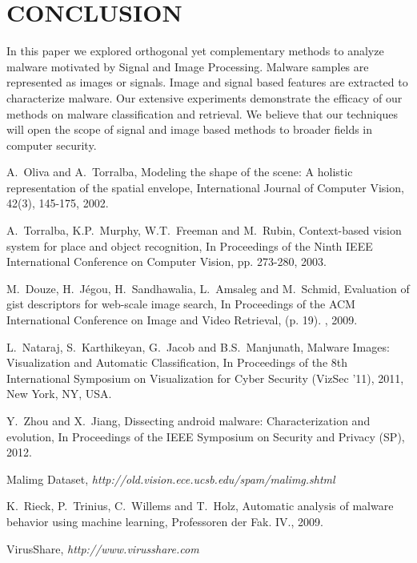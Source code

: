 \documentclass[journal]{IEEEtran}
\begin{document}
\section*{CONCLUSION}

In this paper we explored orthogonal yet complementary methods to analyze malware motivated by Signal and Image Processing.
Malware samples are represented as images or signals.
Image and signal based features are extracted to characterize malware.
Our extensive experiments demonstrate the efficacy of our methods on malware classification and retrieval.
We believe that our techniques will open the scope of signal and image based methods to broader fields in computer security.

\begin{thebibliography}{1}




A.~Oliva and A.~Torralba, Modeling the shape of the scene: A holistic representation of the spatial envelope, International Journal of Computer Vision, 42(3), 145-175, 2002.

A.~Torralba, K.P.~Murphy, W.T.~Freeman and M.~Rubin, Context-based vision system for place and object recognition, In Proceedings of the
Ninth IEEE International Conference on Computer Vision, pp. 273-280, 2003. 

M.~Douze, H.~Jégou, H.~Sandhawalia, L.~Amsaleg and M.~Schmid, Evaluation of gist descriptors for web-scale image search, In Proceedings of the ACM International Conference on Image and Video Retrieval, (p. 19). , 2009. 

L.~Nataraj, S.~Karthikeyan, G.~Jacob and B.S.~Manjunath, Malware Images: Visualization and Automatic Classification, In Proceedings of the 8th International Symposium on Visualization for Cyber Security (VizSec '11), 2011, New York, NY, USA.


Y.~Zhou and X.~Jiang,  Dissecting android malware: Characterization and evolution, In Proceedings of the IEEE Symposium on Security and Privacy (SP), 2012.


Malimg Dataset, {\it http://old.vision.ece.ucsb.edu/spam/malimg.shtml}


K.~Rieck, P.~Trinius, C.~Willems and T.~Holz, Automatic analysis of malware behavior using machine learning, Professoren der Fak. IV., 2009.


VirusShare, {\it http://www.virusshare.com}




\end{thebibliography}
\end{document}
